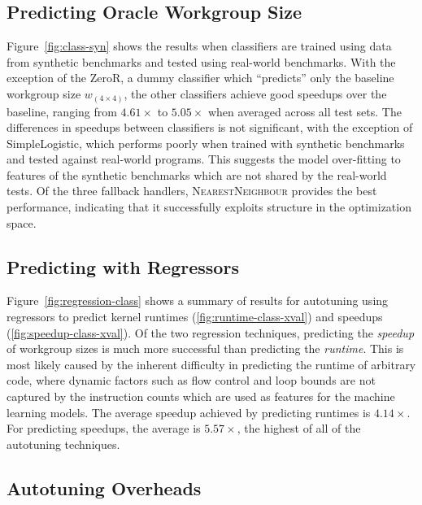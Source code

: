 \subsection{Predicting Oracle Workgroup Size}

Figure~\ref{fig:class-syn} shows the results when classifiers are
trained using data from synthetic benchmarks and tested using
real-world benchmarks. With the exception of the ZeroR, a dummy
classifier which ``predicts'' only the baseline workgroup size
$w_{\left( 4 \times 4 \right)}$, the other classifiers achieve good
speedups over the baseline, ranging from $4.61\times$ to $5.05\times$
when averaged across all test sets. The differences in speedups
between classifiers is not significant, with the exception of
SimpleLogistic, which performs poorly when trained with synthetic
benchmarks and tested against real-world programs. This suggests the
model over-fitting to features of the synthetic benchmarks which are
not shared by the real-world tests. Of the three fallback handlers,
\textsc{NearestNeighbour} provides the best performance, indicating
that it successfully exploits structure in the optimization space.


\subsection{Predicting with Regressors}

Figure~\ref{fig:regression-class} shows a summary of results for
autotuning using regressors to predict kernel runtimes
(\ref{fig:runtime-class-xval}) and speedups
(\ref{fig:speedup-class-xval}). Of the two regression techniques,
predicting the \emph{speedup} of workgroup sizes is much more
successful than predicting the \emph{runtime}. This is most likely
caused by the inherent difficulty in predicting the runtime of
arbitrary code, where dynamic factors such as flow control and loop
bounds are not captured by the instruction counts which are used as
features for the machine learning models. The average speedup achieved
by predicting runtimes is $4.14\times$. For predicting speedups, the
average is $5.57\times$, the highest of all of the autotuning
techniques.


\subsection{Autotuning Overheads}


